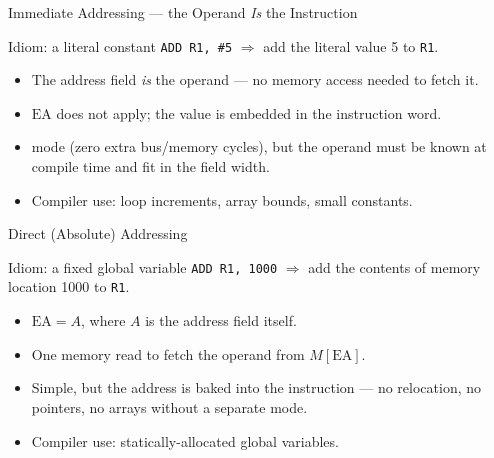 \documentclass[aspectratio=169]{beamer}
\begin{document}
\begin{frame}{Immediate Addressing --- the Operand \emph{Is} the Instruction}
  \begin{exampleblock}{Idiom: a literal constant}
    \texttt{ADD R1, \#5} \quad $\Rightarrow$ \quad add the literal value 5 to \texttt{R1}.
  \end{exampleblock}
  \begin{itemize}
    \item The address field \emph{is} the operand --- no memory access needed to
      fetch it.
    \item $\text{EA}$ does not apply; the value is embedded in the instruction word.
    \item {} mode (zero extra bus/memory cycles), but the operand must be
      known at compile time and fit in the field width.
    \item Compiler use: loop increments, array bounds, small constants.
  \end{itemize}
\end{frame}

\begin{frame}{Direct (Absolute) Addressing}
  \begin{exampleblock}{Idiom: a fixed global variable}
    \texttt{ADD R1, 1000} \quad $\Rightarrow$ \quad add the contents of memory
    location 1000 to \texttt{R1}.
  \end{exampleblock}
  \begin{itemize}
    \item $\text{EA} = A$, where $A$ is the address field itself.
    \item One memory read to fetch the operand from $M[\text{EA}]$.
    \item Simple, but the address is baked into the instruction --- no relocation,
      no pointers, no arrays without a separate mode.
    \item Compiler use: statically-allocated global variables.
  \end{itemize}
\end{frame}
\end{document}
